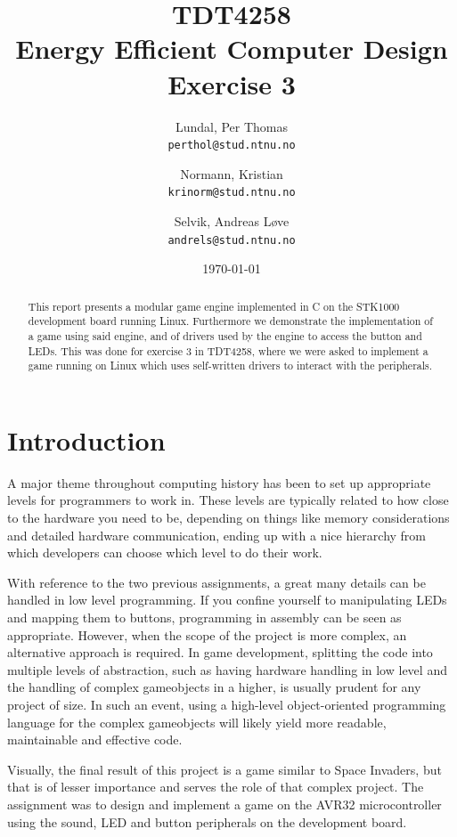 \documentclass[a4paper,12pt]{article}
\title{TDT4258 \\ Energy Efficient Computer Design \\ Exercise 3}
\author{
    Lundal, Per Thomas \\ \texttt{perthol@stud.ntnu.no}
    \and
    Normann, Kristian \\ \texttt{krinorm@stud.ntnu.no}
    \and
    Selvik, Andreas Løve \\ \texttt{andrels@stud.ntnu.no}
}
\date{\today}
\begin{document}
\maketitle
\begin{abstract} %

This report presents a modular game engine implemented in C on the STK1000 development board running Linux. Furthermore we demonstrate the implementation of a game using said engine, and of drivers used by the engine to access the button and LEDs. This was done for exercise 3 in TDT4258, where we were asked to implement a game running on Linux which uses self-written drivers to interact with the peripherals.

\end{abstract}

\newpage
\tableofcontents

\clearpage
\section{Introduction} %

A major theme throughout computing history has been to set up appropriate levels for programmers to work in. These levels are typically related to how close to the hardware you need to be, depending on things like memory considerations and detailed hardware communication, ending up with a nice hierarchy from which developers can choose which level to do their work.

With reference to the two previous assignments, a great many details can be handled in low level programming. If you confine yourself to manipulating LEDs and mapping them to buttons, programming in assembly can be seen as appropriate. However, when the scope of the project is more complex, an alternative approach is required. In game development, splitting the code into multiple levels of abstraction, such as having hardware handling in low level and the handling of complex gameobjects in a higher, is usually prudent for any project of size. In such an event, using a high-level object-oriented programming language for the complex gameobjects will likely yield more readable, maintainable and effective code.

Visually, the final result of this project is a game similar to Space Invaders\cite{Space_invaders}, but that is of lesser importance and serves the role of that complex project. The assignment was to design and implement a game on the AVR32\cite{avr32} microcontroller using the sound, LED and button peripherals on the development board.  
\end{document}
